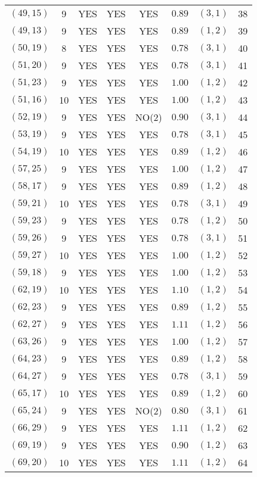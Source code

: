 \begin{longtable}{|c|c|c|c|c|c|c|c|}
$(49,15)$ & 9 & YES & YES & YES & $0.89$ & $(3,1)$ & 38\\
$(49,13)$ & 9 & YES & YES & YES & $0.89$ & $(1,2)$ & 39\\
$(50,19)$ & 8 & YES & YES & YES & $0.78$ & $(3,1)$ & 40\\
$(51,20)$ & 9 & YES & YES & YES & $0.78$ & $(3,1)$ & 41\\
$(51,23)$ & 9 & YES & YES & YES & $1.00$ & $(1,2)$ & 42\\
$(51,16)$ & 10 & YES & YES & YES & $1.00$ & $(1,2)$ & 43\\
$(52,19)$ & 9 & YES & YES & NO(2) & $0.90$ & $(3,1)$ & 44\\
$(53,19)$ & 9 & YES & YES & YES & $0.78$ & $(3,1)$ & 45\\
$(54,19)$ & 10 & YES & YES & YES & $0.89$ & $(1,2)$ & 46\\
$(57,25)$ & 9 & YES & YES & YES & $1.00$ & $(1,2)$ & 47\\
$(58,17)$ & 9 & YES & YES & YES & $0.89$ & $(1,2)$ & 48\\
$(59,21)$ & 10 & YES & YES & YES & $0.78$ & $(3,1)$ & 49\\
$(59,23)$ & 9 & YES & YES & YES & $0.78$ & $(1,2)$ & 50\\
$(59,26)$ & 9 & YES & YES & YES & $0.78$ & $(3,1)$ & 51\\
$(59,27)$ & 10 & YES & YES & YES & $1.00$ & $(1,2)$ & 52\\
$(59,18)$ & 9 & YES & YES & YES & $1.00$ & $(1,2)$ & 53\\
$(62,19)$ & 10 & YES & YES & YES & $1.10$ & $(1,2)$ & 54\\
$(62,23)$ & 9 & YES & YES & YES & $0.89$ & $(1,2)$ & 55\\
$(62,27)$ & 9 & YES & YES & YES & $1.11$ & $(1,2)$ & 56\\
$(63,26)$ & 9 & YES & YES & YES & $1.00$ & $(1,2)$ & 57\\
$(64,23)$ & 9 & YES & YES & YES & $0.89$ & $(1,2)$ & 58\\
$(64,27)$ & 9 & YES & YES & YES & $0.78$ & $(3,1)$ & 59\\
$(65,17)$ & 10 & YES & YES & YES & $0.89$ & $(1,2)$ & 60\\
$(65,24)$ & 9 & YES & YES & NO(2) & $0.80$ & $(3,1)$ & 61\\
$(66,29)$ & 9 & YES & YES & YES & $1.11$ & $(1,2)$ & 62\\
$(69,19)$ & 9 & YES & YES & YES & $0.90$ & $(1,2)$ & 63\\
$(69,20)$ & 10 & YES & YES & YES & $1.11$ & $(1,2)$ & 64\\

\end{longtable}
